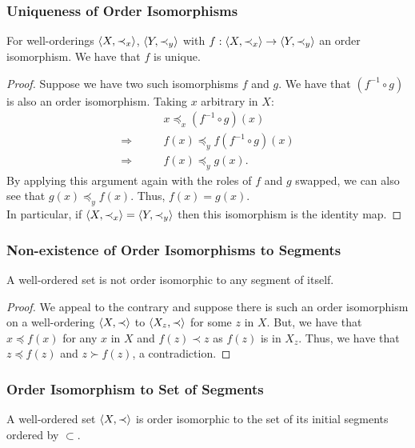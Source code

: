 \subsubsection{Uniqueness of Order Isomorphisms}

For well-orderings $\langle X, \prec_x \rangle$, $\langle Y, \prec_y \rangle$
with $f : \langle X, \prec_x \rangle \to \langle Y, \prec_y \rangle$ an
order isomorphism. We have that $f$ is unique.

\begin{proof}
    Suppose we have two such isomorphisms $f$ and $g$.
    We have that $(f^{-1} \circ g)$ is also an order
    isomorphism. Taking $x$ arbitrary in $X$: \begin{align*}
        &x \preceq_x (f^{-1} \circ g)(x) \\
        \Longrightarrow \qquad & f(x) \preceq_y f(f^{-1} \circ g)(x) \\
        \Longrightarrow \qquad & f(x) \preceq_y g(x).
    \end{align*} By applying this argument again with the roles
    of $f$ and $g$ swapped, we can also see that $g(x) \preceq_y f(x)$.
    Thus, $f(x) = g(x)$.
    \\[\baselineskip]
    In particular, if $\langle X, \prec_x \rangle = \langle Y, \prec_y \rangle$
    then this isomorphism is the identity map.
\end{proof}

\subsubsection{Non-existence of Order Isomorphisms to Segments}

A well-ordered set is not order isomorphic to any segment of itself.

\begin{proof}
    We appeal to the contrary and suppose there is such
    an order isomorphism on a well-ordering $\langle X, \prec \rangle$
    to $\langle X_z, \prec \rangle$ for some $z$ in $X$.
    But, we have that $x \preceq f(x)$ for any $x$ in $X$
    and $f(z) \prec z$ as $f(z)$ is in $X_z$.
    Thus, we have that $z \preceq f(z)$ and $z \succ f(z)$,
    a contradiction.
\end{proof}

\subsubsection{Order Isomorphism to Set of Segments}

A well-ordered set $\langle X, \prec \rangle$ is order isomorphic to the set
of its initial segments ordered by $\subset$.

